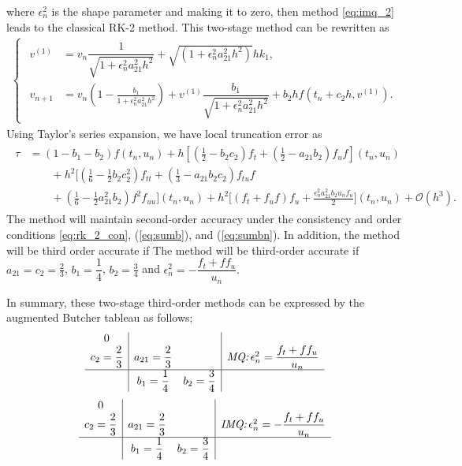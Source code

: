 \documentclass[a4paper, preprint,11pt]{elsarticle}
\numberwithin{equation}{section}
\begin{document}
where $\epsilon_n^2$ is the shape parameter and making it to zero, then method \eqref{eq:imq_2} leads to the classical RK-2 method.  This two-stage method can be rewritten as
\begin{eqnarray*}
\begin{cases}
\begin{aligned}
v^{(1)} &= v_n \dfrac{1} {\sqrt{1 + \epsilon_n^2 a_{21}^2 h^2 }}+\sqrt{(1 + \epsilon_n^2 a_{21}^2 h^2)}h k_1,\\
v_{n+1} &=v_n\left( 1 - \frac{b_1}{1 + \epsilon_n^2 a_{21}^2h^2}\right) 
    + v^{(1)}\dfrac{b_1 }{\sqrt{1 + \epsilon_n^2 a_{21}^2h^2}} + b_2 h f\left(t_n + c_2 h, v^{(1)}\right).
\end{aligned}   
\end{cases}    
\end{eqnarray*}
Using Taylor's series expansion, we have local truncation error as
\begin{eqnarray*}
\begin{aligned}
\tau  & =  (1 - b_1 - b_2) f(t_n,u_n) + h\left[\left( \frac{1}{2} - b_2 c_2 \right) f_t + \left( \frac{1}{2} - a_{21} b_2 \right) f_u f \right](t_n,u_n) \\
& \qquad + h^2\biggl[\left( \frac{1}{6} - \frac{1}{2} b_2 c_2^2 \right) f_{tt} + \left( \frac{1}{3} - a_{21} b_2 c_2 \right) f_{tu} f \\
&\qquad + \left( \frac{1}{6} - \frac{1}{2} a_{21}^2 b_2 \right) f^2f_{uu} \biggl](t_n,u_n)  + h^2\bigg[(f_t + f_u f)f_u + \frac{\epsilon_n^2 a_{21}^2 b_2 u_n f_u}{2}\bigg](t_n,u_n)  +\mathcal{O}(h^3).  
\end{aligned}
\end{eqnarray*}
The method will maintain second-order accuracy under the consistency and order conditions \eqref{eq:rk_2_con}, ({\ref{eq:sumb}}), and ({\ref{eq:sumbn}}). In addition, the method will be third order accurate if
The method will be third-order accurate if $a_{21}  = c_2 = \frac{2}{3}$, $b_1 = \dfrac{1}{4}$, $ b_2 = \frac{3}{4}$ and $\epsilon_n^2 = - \dfrac{f_t + ff_u}{u_n}.$

In summary, these two-stage third-order methods can be expressed by the augmented Butcher tableau as follows;
\begin{equation}
    \begin{array}{c|cc|c}
        0 &  &  \\
        c_2=\dfrac{2}{3} & a_{21}=\dfrac{2}{3} &  &\textit{MQ:}\,\epsilon_n^2=\dfrac{f_t + ff_u}{u_n} \\
        \hline
        & b_1=\dfrac{1}{4} & b_2=\dfrac{3}{4}
    \end{array}
\end{equation}
\begin{equation}
\begin{array}{c|cc|c}
        0 &  &  \\
        c_2=\dfrac{2}{3} & a_{21}=\dfrac{2}{3} &  &\textit{IMQ:}\,\epsilon_n^2=- \dfrac{f_t + ff_u}{u_n} \\
        \hline
        & b_1=\dfrac{1}{4} & b_2=\dfrac{3}{4}
    \end{array}
\end{equation}
\end{document}
